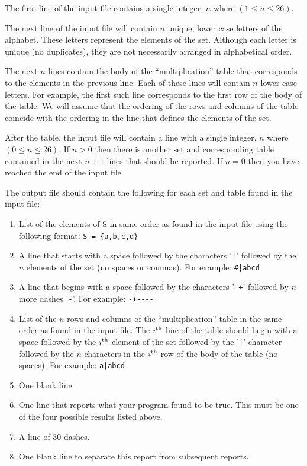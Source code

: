 The first line of the input file contains a single integer, $n$ where
$(1 \le n \le 26)$.

The next line of the input file will contain $n$ unique, lower case
letters of the alphabet.  These letters represent the elements of the
set.  Although each letter is unique (no duplicates), they are not
necessarily arranged in alphabetical order.

The next $n$ lines contain the body of the ``multiplication'' table that
corresponds to the elements in the previous line.  Each of these lines
will contain $n$ lower case letters.  For example, the first such line
corresponds to the first row of the body of the table.  We will assume
that the ordering of the rows and columns of the table coincide with
the ordering in the line that defines the elements of the set.

After the table, the input file will contain a line with a single
integer, $n$ where $(0 \le n \le 26)$.  If $n > 0$ then there is
another set and corresponding table contained in the next $n+1$ lines
that should be reported.  If $n = 0$ then you have reached the end of
the input file.

\newpage

The output file should contain the following for each set and table
found in the input file:

\begin{enumerate}

\item List of the elements of S in same order as found in the input
file using the following format: \verb|S = {a,b,c,d}|

\item A line that starts with a space followed by the characters
'\op\verb"|"' followed by the $n$ elements of the set (no spaces or
commas).  For example: \verb'#|abcd'

\item A line that begins with a space followed by the characters
'\verb|-+|' followed by $n$ more dashes '\verb|-|'.  For example:
\verb|-+----|

\item List of the $n$ rows and columns of the ``multiplication'' table
in the same order as found in the input file.  The $i^{\rm th}$ line
of the table should begin with a space followed by the $i^{\rm th}$
element of the set followed by the '\verb"|"' character followed by
the $n$ characters in the $i^{\rm th}$ row of the body of the table
(no spaces).  For example: \verb'a|abcd'

\item One blank line.

\item One line that reports what your program found to be true.  This
must be one of the four possible results listed above.

\item A line of 30 dashes.

\item One blank line to separate this report from subsequent reports.

\end{enumerate}

